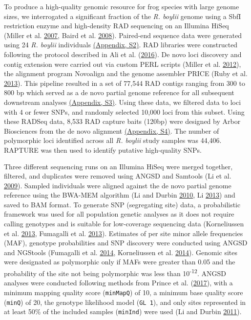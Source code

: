 \documentclass[proquest,12pt,final]{ucthesis-CA2012} %
\begin{document}
\begin{ucmainmatter}
To produce a high-quality genomic resource for frog species with large
genome sizes, we interrogated a significant fraction of the \emph{R.
boylii} genome using a SbfI restriction enzyme and high-density RAD
sequencing on an Illumina HiSeq (Miller et al.
\protect\hyperlink{ref-miller_rapid_2007}{2007}, Baird et al.
\protect\hyperlink{ref-baird_rapid_2008}{2008}). Paired-end sequence
data were generated using 24 \emph{R. boylii} individuals
\protect\hyperlink{supptables}{(Appendix, S2)}. RAD libraries were
constructed following the protocol described in Ali et al.
(\protect\hyperlink{ref-ali_rad_2016}{2016}). De novo loci discovery and
contig extension were carried out via custom PERL scripts (Miller et al.
\protect\hyperlink{ref-miller_conserved_2012}{2012}), the alignment
program Novoalign and the genome assembler PRICE (Ruby et al.
\protect\hyperlink{ref-ruby_price_2013}{2013}). This pipeline resulted
in a set of 77,544 RAD contigs ranging from 300 to 800 bp which served
as a de novo partial genome reference for all subsequent downstream
analyses \protect\hyperlink{supptables}{(Appendix, S3)}. Using these
data, we filtered data to loci with 4 or fewer SNPs, and randomly
selected 10,000 loci from this subset. Using these RADSeq data, 8,533
RAD capture baits (120bp) were designed by Arbor Biosciences from the de
novo alignment \protect\hyperlink{supptables}{(Appendix, S4)}. The
number of polymorphic loci identified across all \emph{R. boylii} study
samples was 44,406. RAPTURE was then used to identify putative
high-quality SNPs.

Three different sequencing runs on an Illumina HiSeq were merged
together, filtered, and duplicates were removed using ANGSD and Samtools
(Li et al. \protect\hyperlink{ref-li_sequence_2009}{2009}). Sampled
individuals were aligned against the de novo partial genome reference
using the BWA-MEM algorithm (Li and Durbin
\protect\hyperlink{ref-li_fast_2010}{2010}, Li
\protect\hyperlink{ref-li_aligning_2013}{2013}) and saved to BAM format.
To generate SNP (segregating site) data, a probabilistic framework was
used for all population genetic analyses as it does not require calling
genotypes and is suitable for low-coverage sequencing data (Korneliussen
et al. \protect\hyperlink{ref-korneliussen_calculation_2013}{2013},
Fumagalli et al.
\protect\hyperlink{ref-fumagalli_quantifying_2013}{2013}). Estimates of
per site minor allele frequencies (MAF), genotype probabilities and SNP
discovery were conducted using ANGSD and NGStools (Fumagalli et al.
\protect\hyperlink{ref-fumagalli_ngstools_2014}{2014}, Korneliussen et
al. \protect\hyperlink{ref-korneliussen_angsd_2014}{2014}). Genomic
sites were designated as polymorphic only if MAFs were greater than 0.05
and the probability of the site not being polymorphic was less than
10\textsuperscript{-12}. ANGSD analyses were conducted following methods
from Prince et al.
(\protect\hyperlink{ref-prince_evolutionary_2017}{2017}), with a minimum
mapping quality score (\texttt{minMapQ}) of 10, a minimum base quality
score (\texttt{minQ}) of 20, the genotype likelihood model
(\texttt{GL\ 1}), and only sites represented in at least 50\% of the
included samples (\texttt{minInd}) were used (Li and Durbin
\protect\hyperlink{ref-li_inference_2011}{2011}).


\end{ucmainmatter}
\end{document}
